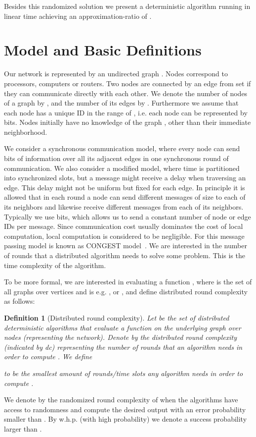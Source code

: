 \documentclass[11pt]{article}
\newtheorem{definition}[theorem]{Definition}
\begin{document}
Besides this randomized solution we present a deterministic algorithm running in linear time  achieving an approximation-ratio of .








\section{Model and Basic Definitions}

Our network is represented by an undirected graph . Nodes  correspond to processors, computers or routers. Two nodes are connected by an edge from set  if they can communicate directly with each other. We denote the number of nodes of a graph by , and the number of its edges by . Furthermore we assume that each node has a unique ID in the range of , i.e. each node can be represented by  bits. Nodes initially have no knowledge of the graph , other than their immediate neighborhood.

We consider a synchronous communication model, where every node can send  bits of information over all its adjacent edges in one synchronous round of communication. We also consider a modified model, where time is partitioned into synchronized slots, but a message might receive a delay when traversing an edge. This delay might not be uniform but fixed for each edge. In principle it is allowed that in each round a node can send different messages of size  to each of its neighbors and likewise receive different messages from each of its neighbors. Typically we use  bits, which allows us to send a constant number of node or edge IDs per message.
Since communication cost usually dominates the cost of local computation, local computation is considered to be negligible.
For  this message passing model is known as CONGEST model~\cite{peleg}.
We are interested in the number of rounds that a distributed algorithm needs to solve some problem. This is the time complexity of the algorithm.

To be more formal, we are interested in evaluating a function , where  is the set of all graphs over  vertices and  is e.g. ,  or , and define distributed round complexity as follows:
\begin{definition}[Distributed round complexity]
Let  be the set of distributed deterministic algorithms that evaluate a function  on the underlying graph  over  nodes (representing the network). Denote by  the distributed round complexity (indicated by dc) representing the number of rounds that an algorithm  needs in order to compute . We define
	
to be the smallest amount of rounds/time slots any algorithm needs in order to compute .
\end{definition}
We denote by  the randomized round complexity of  when the algorithms have access to randomness and compute the desired output with an error probability smaller than . By w.h.p. (with high probability) we denote a success probability larger than .
\end{document}
